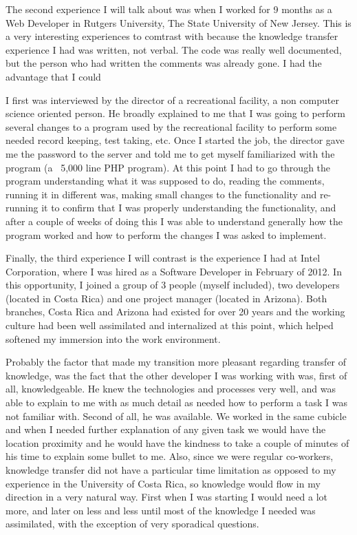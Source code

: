 \documentclass[12pt, letterpaper]{article}
\begin{document}
The second experience I will talk about was when I worked for 9 months as a Web Developer in Rutgers University, The
State University of New Jersey. This is a very interesting experiences to comtrast with because the knowledge 
transfer experience I had was written, not verbal. The code was really well documented, but the person who had 
written the comments was already gone. I had the advantage that I could 

I first was interviewed by the director of a recreational facility, a non computer science oriented person. He broadly 
explained to me that I was going to 
perform several changes to a program used by the recreational facility to perform some needed record keeping,
test taking, etc. Once I started the job, the director gave me the password to the server and told me to 
get myself familiarized with the program (a ~5,000 line PHP program). At this point I had to go through
the program understanding what it was supposed to do, reading the comments, running it in different was, making small 
changes to the 
functionality and re-running it to confirm that I was properly understanding the functionality, and after a couple of 
weeks of doing this I was able to understand generally how the program worked and how to perform the changes I was asked
to implement.

Finally, the third experience I will contrast is the experience I had at Intel Corporation, where I was hired
as a Software Developer in February of 2012. In this opportunity, I joined a group of 3 people (myself included),
two developers (located in Costa Rica) and one project manager (located in Arizona). Both branches, Costa Rica 
and Arizona had existed for over 20 years and the working culture had been well assimilated and internalized
at this point, which helped softened my immersion into the work environment.

Probably the factor that made my transition more pleasant regarding transfer of knowledge, was the fact that 
the other developer I was working with was, first of all, knowledgeable. He knew the technologies and processes
very well, and was able to explain to me with as much detail as needed how to perform a task I was not familiar with. 
Second of all, he was available. We worked in the same cubicle and when I needed further explanation of any given 
task we would have the location proximity and he would have the kindness to take a couple of minutes of his time
to explain some bullet to me. Also, since we were regular co-workers, knowledge transfer did not have a particular
time limitation as opposed to my experience in the University of Costa Rica, so knowledge would flow in my
direction in a very natural way. First when I was starting I would need a lot more, and later on less and less 
until most of the knowledge I needed was assimilated, with the exception of very sporadical questions. 
\end{document}
